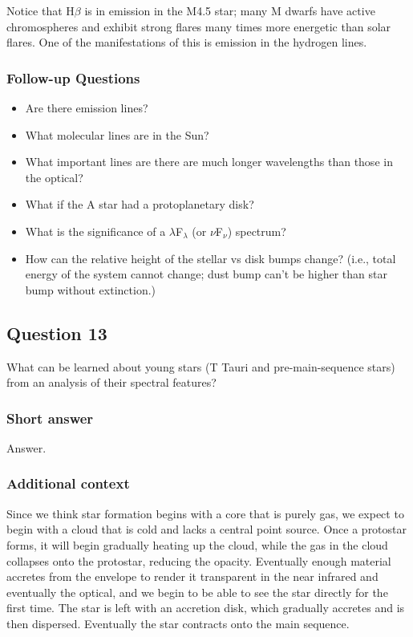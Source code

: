 \documentclass[a4paper,10pt]{article}
\begin{document}
{\noindent}Notice that H$\beta$ is in emission in the M4.5 star; many M dwarfs have active chromospheres and exhibit strong flares many times more energetic than solar flares. One of the manifestations of this is emission in the hydrogen lines.

\subsubsection{Follow-up Questions}

\begin{itemize}
    \item Are there emission lines?
    \item What molecular lines are in the Sun?
    \item What important lines are there are much longer wavelengths than those in the optical?
    \item What if the A star had a protoplanetary disk?
    \item What is the significance of a $\lambda$F$_\lambda$ (or $\nu$F$_\nu$) spectrum?
    \item How can the relative height of the stellar vs disk bumps change? (i.e., total energy of the system cannot change; dust bump can't be higher than star bump without extinction.)
\end{itemize}


\newpage
\subsection{Question 13}

What can be learned about young stars (T Tauri and pre-main-sequence stars) from an analysis of their spectral features?

\subsubsection{Short answer}

Answer.

\subsubsection{Additional context}

Since we think star formation begins with a core that is purely gas, we expect to begin with a cloud that is cold and lacks a central point source. Once a protostar forms, it will begin gradually heating up the cloud, while the gas in the cloud collapses onto the protostar, reducing the opacity. Eventually enough material accretes from the envelope to render it transparent in the near infrared and eventually the optical, and we begin to be able to see the star directly for the first time. The star is left with an accretion disk, which gradually accretes and is then dispersed. Eventually the star contracts onto the main sequence.
\end{document}
